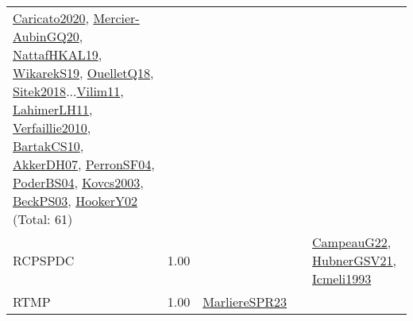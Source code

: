 {\begin{longtable}{p{3cm}r>{\raggedright\arraybackslash}p{6cm}>{\raggedright\arraybackslash}p{6cm}>{\raggedright\arraybackslash}p{8cm}}
\hyperref[detail:Caricato2020]{Caricato2020}, \hyperref[detail:Mercier-AubinGQ20]{Mercier-AubinGQ20}, \hyperref[detail:NattafHKAL19]{NattafHKAL19}, \hyperref[detail:WikarekS19]{WikarekS19}, \hyperref[detail:OuelletQ18]{OuelletQ18}, \hyperref[detail:Sitek2018]{Sitek2018}...\hyperref[detail:Vilim11]{Vilim11}, \hyperref[detail:LahimerLH11]{LahimerLH11}, \hyperref[detail:Verfaillie2010]{Verfaillie2010}, \hyperref[detail:BartakCS10]{BartakCS10}, \hyperref[detail:AkkerDH07]{AkkerDH07}, \hyperref[detail:PerronSF04]{PerronSF04}, \hyperref[detail:PoderBS04]{PoderBS04}, \hyperref[detail:Kovcs2003]{Kovcs2003}, \hyperref[detail:BeckPS03]{BeckPS03}, \hyperref[detail:HookerY02]{HookerY02} (Total: 61)\\
\index{RCPSPDC}\index{Classification!RCPSPDC}RCPSPDC &  1.00 &  &  & \hyperref[detail:CampeauG22]{CampeauG22}, \hyperref[detail:HubnerGSV21]{HubnerGSV21}, \hyperref[detail:Icmeli1993]{Icmeli1993}\\
\index{RTMP}\index{Classification!RTMP}RTMP &  1.00 & \hyperref[detail:MarliereSPR23]{MarliereSPR23} &  & \\

\end{longtable}}

